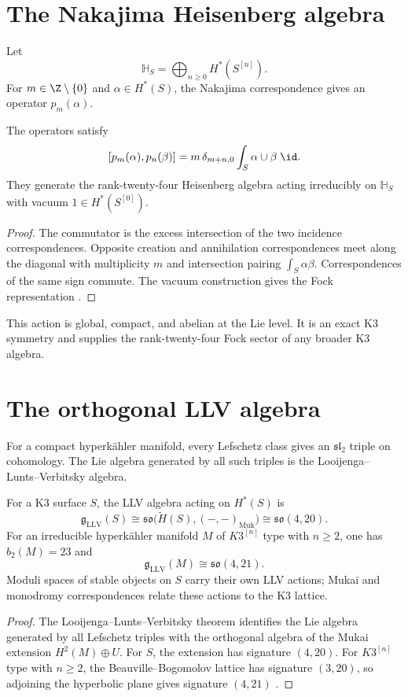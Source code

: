 \chapter{The Nakajima Heisenberg algebra}
Let
\[
 \mathbb H_S=\bigoplus_{n\ge0}H^*(S^{[n]}).
\]
For $m\in\Z\setminus\{0\}$ and $\alpha\in H^*(S)$, the Nakajima correspondence gives an operator $p_m(\alpha)$.

\begin{theorem}
The operators satisfy
\[
 [p_m(\alpha),p_n(\beta)]
 =m\,\delta_{m+n,0}\int_S\alpha\cup\beta\;\id.
\]
They generate the rank-twenty-four Heisenberg algebra acting irreducibly on $\mathbb H_S$ with vacuum $1\in H^*(S^{[0]})$.
\end{theorem}
\begin{proof}
The commutator is the excess intersection of the two incidence correspondences. Opposite creation and annihilation correspondences meet along the diagonal with multiplicity $m$ and intersection pairing $\int_S\alpha\beta$. Correspondences of the same sign commute. The vacuum construction gives the Fock representation \cite{Nakajima97}.
\end{proof}

This action is global, compact, and abelian at the Lie level. It is an exact K3 symmetry and supplies the rank-twenty-four Fock sector of any broader K3 algebra.

\chapter{The orthogonal LLV algebra}
For a compact hyperkähler manifold, every Lefschetz class gives an $\mathfrak{sl}_2$ triple on cohomology. The Lie algebra generated by all such triples is the Looijenga--Lunts--Verbitsky algebra.

\begin{theorem}
For a K3 surface $S$, the LLV algebra acting on $H^*(S)$ is
\[
 \mathfrak g_{\mathrm{LLV}}(S)
 \cong\mathfrak{so}\bigl(\widetilde H(S),(-,-)_{\mathrm{Muk}}\bigr)
 \cong\mathfrak{so}(4,20).
\]
For an irreducible hyperk\"ahler manifold $M$ of $K3^{[n]}$ type with $n\ge2$, one has $b_2(M)=23$ and
\[
 \mathfrak g_{\mathrm{LLV}}(M)\cong\mathfrak{so}(4,21).
\]
Moduli spaces of stable objects on $S$ carry their own LLV actions; Mukai and monodromy correspondences relate these actions to the K3 lattice.
\end{theorem}
\begin{proof}
The Looijenga--Lunts--Verbitsky theorem identifies the Lie algebra generated by all Lefschetz triples with the orthogonal algebra of the Mukai extension $H^2(M)\oplus U$. For $S$, the extension has signature $(4,20)$. For $K3^{[n]}$ type with $n\ge2$, the Beauville--Bogomolov lattice has signature $(3,20)$, so adjoining the hyperbolic plane gives signature $(4,21)$ \cite{LooijengaLunts,Verbitsky96}.
\end{proof}

